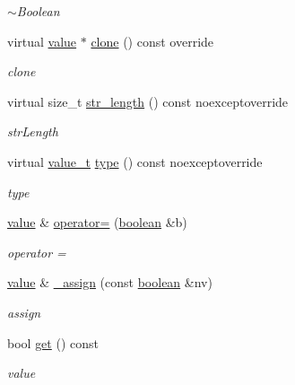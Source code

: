 \begin{DoxyCompactItemize}
\begin{DoxyCompactList}\small\item\em $\sim$\+Boolean \end{DoxyCompactList}\item 
virtual \hyperlink{classformat_1_1value_aa6b85823936bf7b8ab78d3f8d443c00d}{value} $\ast$ \hyperlink{classformat_1_1boolean_aed9485ecc21695be4ef8f03cd1034b1e}{clone} () const override
\begin{DoxyCompactList}\small\item\em clone \end{DoxyCompactList}\item 
virtual size\+\_\+t \hyperlink{classformat_1_1boolean_a3524e3f55c14f667563774b51aa3ffa5}{str\+\_\+length} () const noexceptoverride
\begin{DoxyCompactList}\small\item\em str\+Length \end{DoxyCompactList}\item 
virtual \hyperlink{classformat_1_1value_aa0334be06389a7b14af485fa0cd3aa21}{value\+\_\+t} \hyperlink{classformat_1_1boolean_a91dccd7986764af76b70627a348f27a4}{type} () const noexceptoverride
\begin{DoxyCompactList}\small\item\em type \end{DoxyCompactList}\item 
\hyperlink{classformat_1_1value_aa6b85823936bf7b8ab78d3f8d443c00d}{value} \& \hyperlink{classformat_1_1boolean_acc67b6aa9c4caec2f888d27f32116345}{operator=} (\hyperlink{classformat_1_1boolean}{boolean} \&b)
\begin{DoxyCompactList}\small\item\em operator = \end{DoxyCompactList}\item 
\hyperlink{classformat_1_1value_aa6b85823936bf7b8ab78d3f8d443c00d}{value} \& \hyperlink{classformat_1_1boolean_a430369f7677663e5c61a77ac01e4383f}{\+\_\+assign} (const \hyperlink{classformat_1_1boolean}{boolean} \&nv)
\begin{DoxyCompactList}\small\item\em assign \end{DoxyCompactList}\item 
bool \hyperlink{classformat_1_1boolean_a125e4f567867c95f1f36faee741bc817}{get} () const 
\begin{DoxyCompactList}\small\item\em value \end{DoxyCompactList}\end{DoxyCompactItemize}
